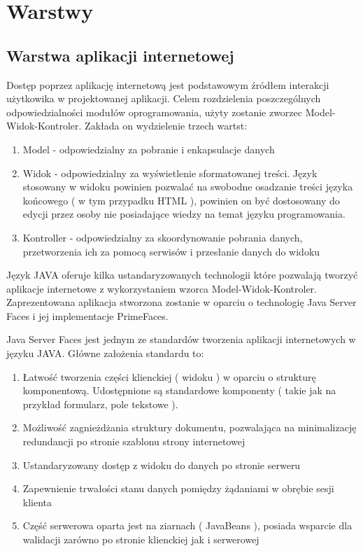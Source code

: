 
\section{Warstwy}
\subsection{Warstwa aplikacji internetowej}
Dostęp poprzez aplikację internetową jest podstawowym źródłem interakcji użytkowika w projektowanej aplikacji. Celem rozdzielenia poszczególnych odpowiedzialności modułów oprogramowania, użyty zostanie zworzec Model-Widok-Kontroler. Zakłada on wydzielenie trzech wartst:
\begin{enumerate}
  \item Model - odpowiedzialny za pobranie i enkapsulacje danych
  \item Widok - odpowiedzialny za wyświetlenie sformatowanej treści. Język stosowany w widoku powinien pozwalać na swobodne osadzanie treści języka końcowego ( w tym przypadku HTML ), powinien on być dostosowany do edycji przez osoby nie posiadające wiedzy na temat języku programowania.
  \item Kontroller - odpowiedzialny za skoordynowanie pobrania danych, przetworzenia ich za pomocą serwisów i przesłanie danych do widoku
\end{enumerate}

Język JAVA oferuje kilka ustandaryzowanych technologii które pozwalają tworzyć aplikacje internetowe z wykorzystaniem wzorca Model-Widok-Kontroler. Zaprezentowana aplikacja stworzona zostanie w oparciu o technologię Java Server Faces i jej implementacje PrimeFaces.

Java Server Faces jest jednym ze standardów tworzenia aplikacji internetowych w języku JAVA\cite{jsfRef}. Główne założenia standardu to:
\begin{enumerate}
  \item Łatwość tworzenia części klienckiej ( widoku ) w oparciu o strukturę komponentową. Udostępnione są standardowe komponenty ( takie jak na przykład formularz, pole tekstowe ).
  \item Możliwość zagnieżdżania struktury dokumentu, pozwalająca na minimalizację redundancji po stronie szablonu strony internetowej 
  \item Ustandaryzowany dostęp z widoku do danych po stronie serweru
  \item Zapewnienie trwałości stanu danych pomiędzy żądaniami w obrębie sesji klienta
  \item Część serwerowa oparta jest na ziarnach ( JavaBeans ), posiada wsparcie dla walidacji zarówno po stronie klienckiej jak i serwerowej
\end{enumerate}


